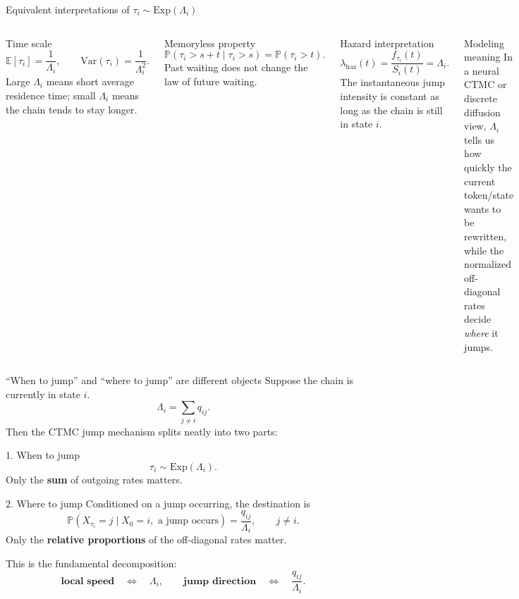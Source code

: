 \documentclass[aspectratio=169,professionalfonts]{beamer}
\newcommand{\Prob}{\mathbb{P}}
\newcommand{\E}{\mathbb{E}}
\begin{document}
\begin{frame}{Equivalent interpretations of $\tau_i\sim\mathrm{Exp}(\Lambda_i)$}
\small
\begin{columns}[T,totalwidth=\textwidth]
\begin{block}{Time scale}
\[
\E[\tau_i]=\frac{1}{\Lambda_i},
\qquad
\mathrm{Var}(\tau_i)=\frac{1}{\Lambda_i^2}.
\]
Large $\Lambda_i$ means short average residence time; small $\Lambda_i$ means the chain tends to stay longer.
\end{block}

\begin{alertblock}{Memoryless property}
\[
\Prob(\tau_i>s+t\mid \tau_i>s)=\Prob(\tau_i>t).
\]
Past waiting does not change the law of future waiting.
\end{alertblock}

\begin{block}{Hazard interpretation}
\[
\lambda_{\text{haz}}(t)=\frac{f_{\tau_i}(t)}{S_i(t)}=\Lambda_i.
\]
The instantaneous jump intensity is constant as long as the chain is still in state $i$.
\end{block}

\begin{alertblock}{Modeling meaning}
In a neural CTMC or discrete diffusion view, $\Lambda_i$ tells us how quickly the current token/state wants to be rewritten, while the normalized off-diagonal rates decide \emph{where} it jumps.
\end{alertblock}
\end{columns}
\end{frame}

\begin{frame}{``When to jump'' and ``where to jump'' are different objects}
Suppose the chain is currently in state $i$.
\[
\Lambda_i=\sum_{j\neq i} q_{ij}.
\]
Then the CTMC jump mechanism splits neatly into two parts:

\begin{block}{1. When to jump}
\[
\tau_i\sim \mathrm{Exp}(\Lambda_i).
\]
Only the \textbf{sum} of outgoing rates matters.
\end{block}

\begin{alertblock}{2. Where to jump}
Conditioned on a jump occurring, the destination is
\[
\Prob(X_{\tau_i}=j\mid X_0=i,\text{ a jump occurs})=\frac{q_{ij}}{\Lambda_i},\qquad j\neq i.
\]
Only the \textbf{relative proportions} of the off-diagonal rates matter.
\end{alertblock}

\vspace{0.06cm}
This is the fundamental decomposition:
\[
\textbf{local speed} \quad \Longleftrightarrow \quad \Lambda_i,
\qquad
\textbf{jump direction} \quad \Longleftrightarrow \quad \frac{q_{ij}}{\Lambda_i}.
\]
\end{frame}
\end{document}
